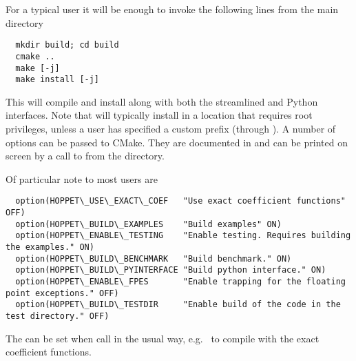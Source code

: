 For a typical user it will be enough to invoke the following lines
from the main directory
\begin{lstlisting}
  mkdir build; cd build
  cmake ..
  make [-j]
  make install [-j]
\end{lstlisting}
This will compile and install \hoppet along with both the streamlined
and Python interfaces. Note that  will typically
install in a location that requires root privileges, unless a user has
specified a custom prefix (through
). A number of options can
be passed to CMake. They are documented in
 and can be printed on screen
by a call to  from the  directory.

Of particular note to most users are
\begin{lstlisting}
  option(HOPPET\_USE\_EXACT\_COEF   "Use exact coefficient functions"  OFF)
  option(HOPPET\_BUILD\_EXAMPLES    "Build examples" ON)
  option(HOPPET\_ENABLE\_TESTING    "Enable testing. Requires building the examples." ON)
  option(HOPPET\_BUILD\_BENCHMARK   "Build benchmark." ON)
  option(HOPPET\_BUILD\_PYINTERFACE "Build python interface." ON)
  option(HOPPET\_ENABLE\_FPES       "Enable trapping for the floating point exceptions." OFF)
  option(HOPPET\_BUILD\_TESTDIR     "Enable build of the code in the test directory." OFF)
\end{lstlisting}
The can be set when call  in the usual way,
e.g.\  to compile \hoppet
with the exact coefficient functions.

